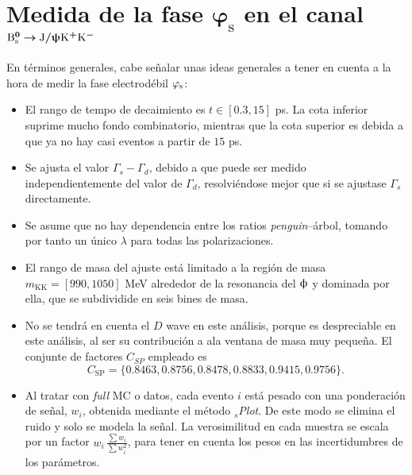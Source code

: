 \chapter[Medida de la fase $\varphi_s$ en el canal $\Bs \rightarrow \Jpsi \antikaon\kaon$]{Medida de la fase $\bm{\varphi_{\mathrm{s}}}$ en el canal $\bm{\text{B}{}_{\text{s}}^{0} \rightarrow \text{J}/\uppsi  \text{K}{}^{+}\text{K}{}^{-}}$}
\label{cha:ana}


En términos generales, cabe señalar unas ideas generales a tener en cuenta a la hora de medir la fase electrodébil $\varphi_{\text{s}}$:
\begin{itemize}
    \item El rango de tempo de decaimiento es $t\in[0.3,15]$ ps. La cota inferior suprime mucho fondo combinatorio, mientras que la cota superior es debida a que ya no hay casi eventos a partir de $15$ ps.
  \item Se ajusta el valor $\Gamma_s - \Gamma_d$, debido a que puede ser medido independientemente del valor de $\Gamma_d$, resolviéndose mejor que si se ajustase $\Gamma_s$ directamente.
  \item Se asume que no hay dependencia entre los ratios \textit{penguin}--árbol, tomando por tanto un único $\lambda$ para todas las polarizaciones.
  \item El rango de masa del ajuste está limitado a la región de masa $m_{\text{KK}} = [990,1050]$ MeV alrededor de la resonancia del $\upphi$ y dominada por ella, que se subdividide en seis bines de masa.
  \item No se tendrá en cuenta el $D$ wave en este análisis, porque es despreciable en este análisis, al ser su contribución a ala ventana de masa muy pequeña. El conjunte de factores $C_{SP}$ empleado es $$ C_{\text{SP}}  = \{0.8463,0.8756,0.8478,0.8833,0.9415,0.9756\}.$$
  \item Al tratar con \emph{full} MC o datos, cada evento $i$ está pesado con una ponderación de señal, $w_i$, obtenida mediante el método ${}_s$\textit{Plot}. De este modo se elimina el ruido y solo se modela la señal. La verosimilitud en cada muestra se escala por un factor $w_i \,\frac{\sum w_i}{\sum w_i^2}$, para tener en cuenta los pesos en las incertidumbres de los parámetros.
\end{itemize}





